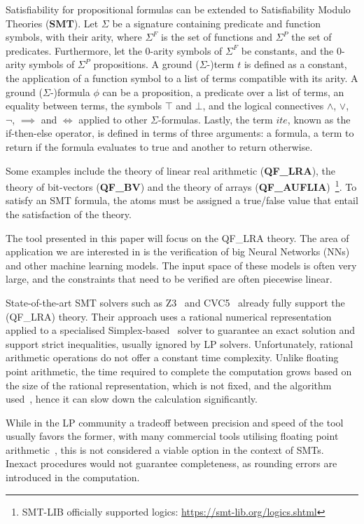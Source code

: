 \documentclass[runningheads]{llncs}
\begin{document}
Satisfiability for propositional formulas can be extended to Satisfiability Modulo Theories (\textbf{SMT}).
Let $\Sigma$ be a signature containing predicate and function symbols, with their arity, where $\Sigma^F$ is the set of functions and $\Sigma^P$ the set of predicates.
Furthermore, let the 0-arity symbols of $\Sigma^F$ be constants, and the 0-arity symbols of $\Sigma^P$ propositions.
A ground ($\Sigma$-)term $t$ is defined as a constant, the application of a function symbol to a list of terms compatible with its arity.
A ground ($\Sigma$-)formula $\phi$ can be a proposition, a predicate over a list of terms, an equality between terms, the symbols $\top$ and $\bot$, and the logical connectives $\land$, $\lor$, $\neg$, $\implies$ and $\iff$ applied to other $\Sigma$-formulas.
Lastly, the term $ite$, known as the if-then-else operator, is defined in terms of three arguments: a formula, a term to return if the formula evaluates to true and another to return otherwise.

Some examples include the theory of linear real arithmetic (\textbf{QF\_LRA}), the theory of bit-vectors (\textbf{QF\_BV}) and the theory of arrays (\textbf{QF\_AUFLIA})~\footnote{SMT-LIB officially supported logics: \url{https://smt-lib.org/logics.shtml}}.
To satisfy an SMT formula, the atoms must be assigned a true/false value that entail the satisfaction of the theory.

The tool presented in this paper will focus on the QF\_LRA theory.
The area of application we are interested in is the verification of big Neural Networks (NNs) and other machine learning models.
The input space of these models is often very large, and the constraints that need to be verified are often piecewise linear.

State-of-the-art SMT solvers such as Z3~\cite{ref:z3} and CVC5~\cite{ref:cvc5} already fully support the (QF\_LRA) theory.
Their approach uses a rational numerical representation applied to a specialised Simplex-based~\cite{ref:simplex} solver to guarantee an exact solution and support strict inequalities, usually ignored by LP solvers.
Unfortunately, rational arithmetic operations do not offer a constant time complexity. %
Unlike floating point arithmetic, the time required to complete the computation grows based on the size of the rational representation, which is not fixed, and the algorithm used~\cite{ref:fft-mult}, hence it can slow down the calculation significantly.

While in the LP community a tradeoff between precision and speed of the tool usually favors the former, with many commercial tools utilising floating point arithmetic~\cite{ref:gurobi}, this is not considered a viable option in the context of SMTs.
Inexact procedures would not guarantee completeness, as rounding errors are introduced in the computation.
\end{document}

